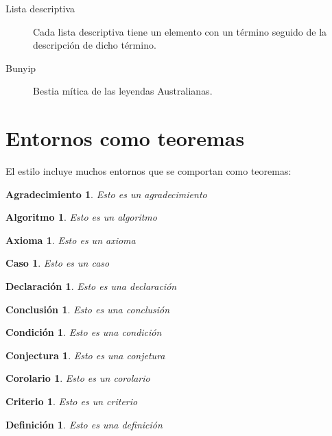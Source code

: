 \documentclass[11pt,spanish]{report}
\newtheorem{acknowledgement}{Agradecimiento}[section]
\newtheorem{algorithm}{Algoritmo}[section]
\newtheorem{axiom}{Axioma}[section]
\newtheorem{case}{Caso}[section]
\newtheorem{claim}{Declaración}[section]
\newtheorem{conclusion}{Conclusión}[section]
\newtheorem{condition}{Condición}[section]
\newtheorem{conjecture}{Conjectura}[section]
\newtheorem{corollary}{Corolario}[section]
\newtheorem{criterion}{Criterio}[section]
\newtheorem{definition}{Definición}[section]
\begin{document}
\begin{description}
\item[Lista descriptiva] Cada lista descriptiva tiene un elemento con un término seguido de la descripción de dicho término.

\item[Bunyip] Bestia mítica de las leyendas Australianas.
\end{description}

\section{Entornos como teoremas}

El estilo incluye muchos entornos que se comportan como teoremas:

\begin{acknowledgement}
Esto es un agradecimiento
\end{acknowledgement}

\begin{algorithm}
Esto es un algoritmo
\end{algorithm}

\begin{axiom}
Esto es un axioma
\end{axiom}

\begin{case}
Esto es un caso
\end{case}

\begin{claim}
Esto es una declaración
\end{claim}

\begin{conclusion}
Esto es una conclusión
\end{conclusion}

\begin{condition}
Esto es una condición
\end{condition}

\begin{conjecture}
Esto es una conjetura
\end{conjecture}

\begin{corollary}
Esto es un corolario
\end{corollary}

\begin{criterion}
Esto es un criterio
\end{criterion}

\begin{definition}
Esto es una definición
\end{definition}
\end{document}
